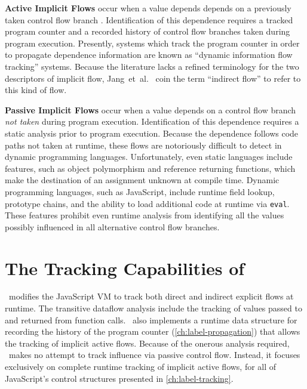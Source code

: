 \begin{description}
\item{
\textbf{Active Implicit Flows} occur when a value depends depends on a previously taken control flow branch .
Identification of this dependence requires a tracked program counter and a recorded history of control flow branches taken during program execution.
Presently, systems which track the program counter in order to propagate dependence information are known as ``dynamic information flow tracking'' systems.
Because the literature lacks a refined terminology for the two descriptors of implicit flow, Jang~et~al.~\cite{jang.etal+10} coin the term ``indirect flow'' to refer to this kind of flow.
}

\item{
\textbf{Passive Implicit Flows} occur when a value depends on a control flow branch \emph{not taken} during program execution.
Identification of this dependence requires a static analysis prior to program execution.
Because the dependence follows code paths not taken at runtime, these flows are notoriously difficult to detect in dynamic programming languages.
Unfortunately, even static languages include features, such as object polymorphism and reference returning functions, which make the destination of an assignment unknown at compile time.
Dynamic programming languages, such as JavaScript, include runtime field lookup, prototype chains, and the ability to load additional code at runtime via \texttt{eval}.
These features prohibit even runtime analysis from identifying all the values possibly influenced in all alternative control flow branches.
}

\end{description}

\section{The Tracking Capabilities of \FlowCore}
\label{sec:tracking-capabilities}

\FlowCore\ modifies the JavaScript VM to track both direct and indirect explicit flows at runtime.
The transitive dataflow analysis include the tracking of values passed to and returned from function calls.
\FlowCore\ also implements a runtime data structure for recording the history of the program counter (\autoref{ch:label-propagation}) that allows the tracking of implicit active flows.
Because of the onerous analysis required, \FlowCore\ makes no attempt to track influence via passive control flow.
Instead, it focuses exclusively on complete runtime tracking of implicit active flows, for all of JavaScript's control structures presented in \autoref{ch:label-tracking}.
